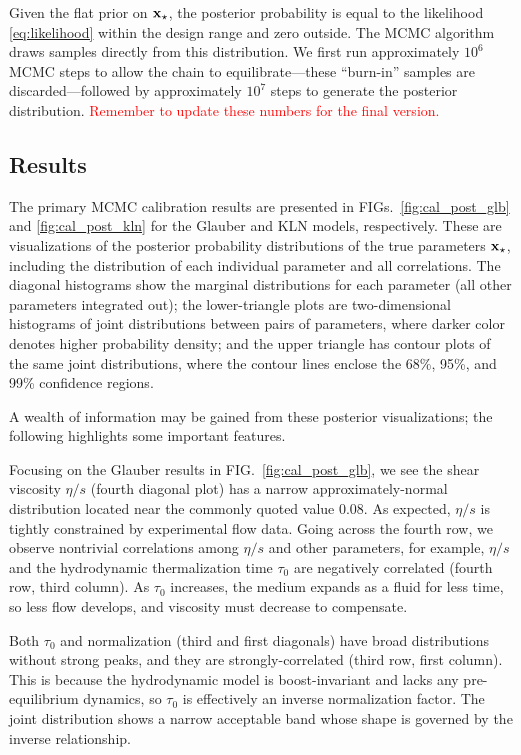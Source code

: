 \documentclass[aps,prc,reprint,superscriptaddress,amsmath]{revtex4-1}
\newcommand{\todo}[1]{\textcolor{red}{#1}}
\begin{document}
Given the flat prior on $\mathbf x_\star$, the posterior probability is equal to the likelihood \eqref{eq:likelihood} within the design range and zero outside.
The MCMC algorithm draws samples directly from this distribution.
We first run approximately $10^6$ MCMC steps to allow the chain to equilibrate---these ``burn-in'' samples are discarded---followed by approximately $10^7$ steps to generate the posterior distribution.
\todo{Remember to update these numbers for the final version.}

\subsection{Results}

The primary MCMC calibration results are presented in FIGs.~\ref{fig:cal_post_glb} and \ref{fig:cal_post_kln} for the Glauber and KLN models, respectively.
These are visualizations of the posterior probability distributions of the true parameters $\mathbf x_\star$, including the distribution of each individual parameter and all correlations.
The diagonal histograms show the marginal distributions for each parameter (all other parameters integrated out);
the lower-triangle plots are two-dimensional histograms of joint distributions between pairs of parameters, where darker color denotes higher probability density;
and the upper triangle has contour plots of the same joint distributions, where the contour lines enclose the 68\%, 95\%, and 99\% confidence regions.

A wealth of information may be gained from these posterior visualizations; the following highlights some important features.

Focusing on the Glauber results in FIG.~\ref{fig:cal_post_glb}, we see the shear viscosity $\eta/s$ (fourth diagonal plot) has a narrow approximately-normal distribution located near the commonly quoted value 0.08.
As expected, $\eta/s$ is tightly constrained by experimental flow data.
Going across the fourth row, we observe nontrivial correlations among $\eta/s$ and other parameters, for example, $\eta/s$ and the hydrodynamic thermalization time $\tau_0$ are negatively correlated (fourth row, third column).
As $\tau_0$ increases, the medium expands as a fluid for less time, so less flow develops, and viscosity must decrease to compensate.

Both $\tau_0$ and normalization (third and first diagonals) have broad distributions without strong peaks, and they are strongly-correlated (third row, first column).
This is because the hydrodynamic model is boost-invariant and lacks any pre-equilibrium dynamics, so $\tau_0$ is effectively an inverse normalization factor.
The joint distribution shows a narrow acceptable band whose shape is governed by the inverse relationship.
\end{document}
